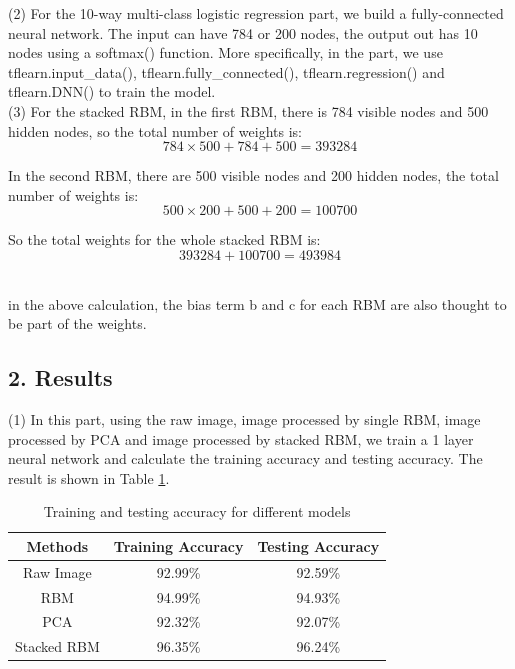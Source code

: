 \noindent (2) For the 10-way multi-class logistic regression part, we build a fully-connected neural network. The input can have 784 or 200 nodes, the output out has 10 nodes using a softmax() function. More specifically, in the part, we use tflearn.input\_data(), tflearn.fully\_connected(), tflearn.regression() and tflearn.DNN() to train the model. \\

\noindent (3) For the stacked RBM, in the first RBM, there is 784 visible nodes and 500 hidden nodes, so the total number of weights is:
\begin{equation}
784 \times 500 + 784 + 500 = 393284
\end{equation}

In the second RBM, there are 500 visible nodes and 200 hidden nodes, the total number of weights is:
\begin{equation}
500 \times 200 + 500 + 200 = 100700
\end{equation}

So the total weights for the whole stacked RBM is:
\begin{equation}
393284 + 100700 = 493984
\end{equation}\

 in the above calculation, the bias term b and c for each RBM are also thought to be part of the weights.\\


\subsection*{\large 2. Results}

(1) In this part, using the raw image, image processed by single RBM, image processed by PCA and image processed by stacked RBM, we train a 1 layer neural network and calculate the training accuracy and testing accuracy. The result is shown in Table \ref{table:BESTacc}. 

\begin{table}[H]
	\centering
	\caption{Training and testing accuracy for different models}
	\label{table:BESTacc}	
	\begin{tabular}{c | c | c}
		\hline \hline
		Methods  	&	Training Accuracy 	&	Testing Accuracy \\[0.1cm]
		\hline
		Raw Image	&	92.99\%				& 	92.59\%			 \\[0.1cm]
		RBM			&	94.99\%				& 	94.93\%			 \\[0.1cm]
		PCA			& 	92.32\%				& 	92.07\%			 \\[0.1cm]
		Stacked RBM & 	96.35\%				& 	96.24\%			 \\[0.1cm]
		\hline	
	\end{tabular}
\end{table}

